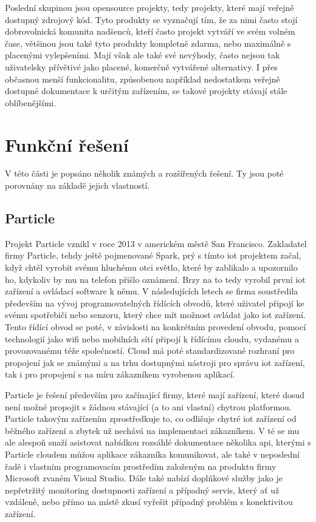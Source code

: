 Poslední skupinou jsou opensource projekty, tedy projekty, které mají veřejně dostupný zdrojový kód. Tyto produkty se vyznačují tím, že za nimi často stojí dobrovolnická komunita nadšenců, kteří často projekt vytváří ve svém volném čase, většinou jsou také tyto produkty kompletně zdarma, nebo maximálně s placenými vylepšeními. Mají však ale také své nevýhody, často nejsou tak uživatelsky přívětivé jako placené, komerčně vytvářené alternativy. I přes občasnou menší funkcionalitu, způsobenou například nedostatkem veřejně dostupné dokumentace k určitým zařízením, se takové projekty stávají stále oblíbenějšími.

\section{Funkční řešení}

V této části je popsáno několik známých a rozšířených řešení. Ty jsou poté porovnány na základě jejich vlastností.

\subsection{Particle}

Projekt Particle vznikl v roce 2013 v americkém městě San Francisco. Zakladatel firmy Particle, tehdy ještě pojmenované Spark, prý s tímto \acrshort{iot} projektem začal, když chtěl vyrobit svému hluchému otci světlo, které by zablikalo a upozornilo ho, kdykoliv by mu na telefon přišlo oznámení. Brzy na to tedy vyrobil první \acrshort{iot} zařízení a ovládací software k němu. V následujících letech se firma soustředila především na vývoj programovatelných řídících obvodů, které uživatel připojí ke svému spotřebiči nebo senzoru, který chce mít možnost ovládat jako \acrshort{iot} zařízení. Tento řídící obvod se poté, v závislosti na konkrétním provedení obvodu, pomocí technologií jako \acrshort{wifi} nebo mobilních sítí připojí k řídícímu cloudu, vydanému a provozovanému téže společností. Cloud má poté standardizované rozhraní pro propojení jak se známými a na trhu dostupnými nástroji pro správu \acrshort{iot} zařízení, tak i pro propojení s na míru zákazníkem vyrobenou aplikací. 

Particle je řešení především pro začínající firmy, které mají zařízení, které dosud není možné propojit s žádnou stávající (a to ani vlastní) chytrou platformou. Particle takovým zařízením zprostředkuje to, co odlišuje chytré \acrshort{iot} zařízení od běžného zařízení a zbytek už nechává na implementaci zákazníkem. V té se mu ale alespoň snaží asistovat nabídkou rozsáhlé dokumentace několika \acrshort{api}, kterými s Particle cloudem můžou aplikace zákazníka komunikovat, ale také v neposlední řadě i vlastním programovacím prostředím založeným na produktu firmy Microsoft zvaném Visual Studio. Dále také nabízí doplňkové služby jako je nepřetržitý monitoring dostupnosti zařízení a případný servis, který ať už vzdáleně, nebo přímo na místě zkusí vyřešit případný problém s konektivitou zařízení.

